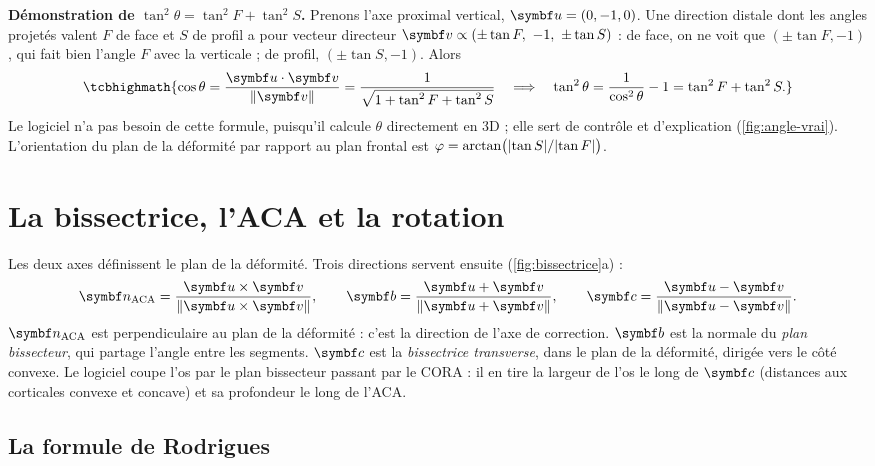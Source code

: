\textbf{Démonstration de $\tan^2\theta = \tan^2 F + \tan^2 S$.} Prenons l'axe proximal vertical,
$\vb{u} = (0, -1, 0)$. Une direction distale dont les angles projetés valent $F$ de face et $S$ de profil a pour
vecteur directeur $\vb{v} \propto (\pm\tan F,\ -1,\ \pm\tan S)$ : de face, on ne voit que $(\pm\tan F, -1)$, qui fait
bien l'angle $F$ avec la verticale ; de profil, $(\pm\tan S, -1)$. Alors
\begin{equation}
  \tcbhighmath{\cos\theta = \frac{\vb{u}\cdot\vb{v}}{\norm{\vb{v}}} = \frac{1}{\sqrt{1 + \tan^2 F + \tan^2 S}}
  \quad\Longrightarrow\quad
  \tan^2\theta = \frac{1}{\cos^2\theta} - 1 = \tan^2 F + \tan^2 S.}
\end{equation}
Le logiciel n'a pas besoin de cette formule, puisqu'il calcule $\theta$ directement en 3D ; elle sert de contrôle et
d'explication (\cref{fig:angle-vrai}). L'orientation du plan de la déformité par rapport au plan frontal est
$\varphi = \arctan\bigl(\lvert\tan S\rvert/\lvert\tan F\rvert\bigr)$.


\section{La bissectrice, l'ACA et la rotation}
\label{sec:bissectrice}

Les deux axes définissent le plan de la déformité. Trois directions servent ensuite (\cref{fig:bissectrice}a) :
\begin{equation}
  \vb{n}_{\text{ACA}} = \frac{\vb{u}\times\vb{v}}{\norm{\vb{u}\times\vb{v}}}, \qquad
  \vb{b} = \frac{\vb{u} + \vb{v}}{\norm{\vb{u} + \vb{v}}}, \qquad
  \vb{c} = \frac{\vb{u} - \vb{v}}{\norm{\vb{u} - \vb{v}}}.
\end{equation}
$\vb{n}_{\text{ACA}}$ est perpendiculaire au plan de la déformité : c'est la direction de l'axe de correction.
$\vb{b}$ est la normale du \emph{plan bissecteur}, qui partage l'angle entre les segments. $\vb{c}$ est la
\emph{bissectrice transverse}, dans le plan de la déformité, dirigée vers le côté convexe. Le logiciel coupe l'os par
le plan bissecteur passant par le CORA : il en tire la largeur de l'os le long de $\vb{c}$ (distances aux corticales
convexe et concave) et sa profondeur le long de l'ACA.

\subsection{La formule de Rodrigues}

